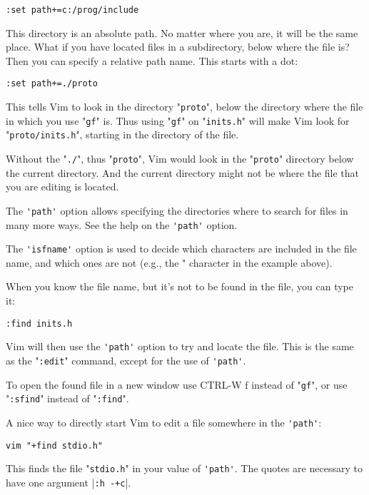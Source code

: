 \begin{Verbatim}[samepage=true]
 :set path+=c:/prog/include
\end{Verbatim}

This directory is an absolute path.
No matter where you are, it will be the same place.
What if you have located files in a subdirectory, below where the file is?  Then you can specify a relative path name.
This starts with a dot:

\begin{Verbatim}[samepage=true]
 :set path+=./proto
\end{Verbatim}

This tells Vim to look in the directory "\verb!proto!", below the directory where the file in which you use "\verb!gf!" is.
Thus using "\verb!gf!" on "\verb!inits.h!" will make Vim look for "\verb!proto/inits.h!", starting in the directory of the file.

Without the "\verb!./!", thus "\verb!proto!", Vim would look in the "\verb!proto!" directory below the current directory.
And the current directory might not be where the file that you are editing is located.

The \verb!'path'! option allows specifying the directories where to search for files in many more ways.
See the help on the \verb!'path'! option.

The \verb!'isfname'! option is used to decide which characters are included in the file name, and which ones are not (e.g., the " character in the example above).

When you know the file name, but it's not to be found in the file, you can type it:

\begin{Verbatim}[samepage=true]
 :find inits.h
\end{Verbatim}

Vim will then use the \verb!'path'! option to try and locate the file.
This is the same as the "\verb!:edit!" command, except for the use of \verb!'path'!.

To open the found file in a new window use CTRL-W f instead of "\verb!gf!", or use "\verb!:sfind!" instead of "\verb!:find!".

A nice way to directly start Vim to edit a file somewhere in the \verb!'path'!:

\begin{Verbatim}[samepage=true]
 vim "+find stdio.h"
\end{Verbatim}

This finds the file "\verb!stdio.h!" in your value of \verb!'path'!.
The quotes are necessary to have one argument |\verb!:h -+c!|.
